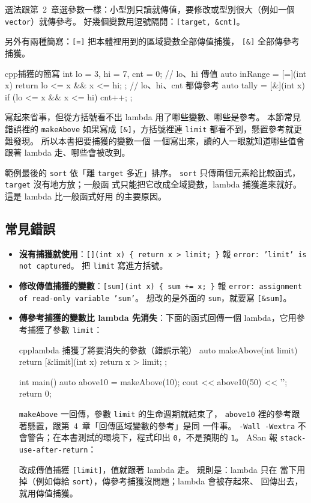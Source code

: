 選法跟第~2~章選參數一樣：小型別只讀就傳值，要修改或型別很大（例如一個
\texttt{vector}）就傳參考。 好幾個變數用逗號隔開：\texttt{[target,
\&cnt]}。

另外有兩種簡寫：\texttt{[=]} 把本體裡用到的區域變數全部傳值捕獲，
\texttt{[\&]} 全部傳參考捕獲。

\begin{code}{cpp}{捕獲的簡寫}
int lo = 3, hi = 7, cnt = 0;
// lo、hi 傳值
auto inRange = [=](int x) { return lo <= x && x <= hi; };
// lo、hi、cnt 都傳參考
auto tally = [&](int x) { if (lo <= x && x <= hi) cnt++; };
\end{code}

寫起來省事，但從方括號看不出 lambda 用了哪些變數、哪些是參考。 本節常見
錯誤裡的 \texttt{makeAbove} 如果寫成 \texttt{[\&]}，方括號裡連
\texttt{limit} 都看不到，懸置參考就更難發現。 所以本書把要捕獲的變數一個
一個寫出來，讀的人一眼就知道哪些值會跟著 lambda 走、哪些會被改到。

範例最後的 \texttt{sort} 依「離 \texttt{target} 多近」排序。
\texttt{sort} 只傳兩個元素給比較函式，\texttt{target} 沒有地方放；一般函
式只能把它改成全域變數，lambda 捕獲進來就好。 這是 lambda 比一般函式好用
的主要原因。

\subsection{常見錯誤}

\begin{itemize}
\item \textbf{沒有捕獲就使用}：\texttt{[](int x) \{ return x > limit; \}}
報 \texttt{error: 'limit' is not captured}。 把 \texttt{limit} 寫進方括號。
\item \textbf{修改傳值捕獲的變數}：\texttt{[sum](int x) \{ sum += x; \}}
報 \texttt{error: assignment of read-only variable 'sum'}。 想改的是外面的
\texttt{sum}，就要寫 \texttt{[\&sum]}。
\item \textbf{傳參考捕獲的變數比 lambda 先消失}：下面的函式回傳一個
lambda，它用參考捕獲了參數 \texttt{limit}：
\begin{code}{cpp}{lambda 捕獲了將要消失的參數（錯誤示範）}
auto makeAbove(int limit) {
    return [&limit](int x) { return x > limit; };
}

int main() {
    auto above10 = makeAbove(10);
    cout << above10(50) << '\n';
    return 0;
}
\end{code}
\texttt{makeAbove} 一回傳，參數 \texttt{limit} 的生命週期就結束了，
\texttt{above10} 裡的參考跟著懸置，跟第~4~章「回傳區域變數的參考」是同
一件事。 \texttt{-Wall -Wextra} 不會警告；在本書測試的環境下，程式印出
\texttt{0}，不是預期的 \texttt{1}。 ASan 報 \texttt{stack-use-after-return}：
改成傳值捕獲 \texttt{[limit]}，值就跟著 lambda 走。 規則是：lambda 只在
當下用掉（例如傳給 \texttt{sort}），傳參考捕獲沒問題；lambda 會被存起來、
回傳出去，就用傳值捕獲。
\end{itemize}

